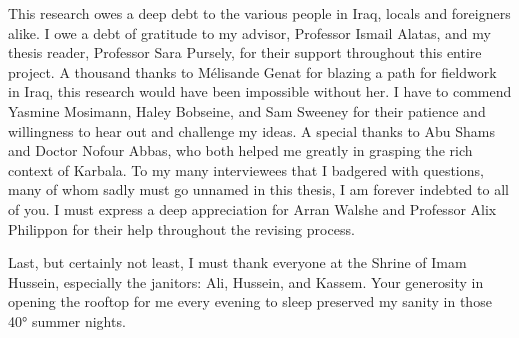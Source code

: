 This research owes a deep debt to the various people in Iraq, locals and foreigners alike. I owe a debt of gratitude to my advisor, Professor Ismail Alatas, and my thesis reader, Professor Sara Pursely, for their support throughout this entire project.
A thousand thanks to Mélisande Genat for blazing a path for fieldwork in Iraq, this research would have been impossible without her. I have to commend Yasmine Mosimann, Haley Bobseine, and Sam Sweeney for their patience and willingness to hear out and challenge my ideas. A special thanks to Abu Shams and Doctor Nofour Abbas, who both helped me greatly in grasping the rich context of Karbala. To my many interviewees that I badgered with questions, many of whom sadly must go unnamed in this thesis, I am forever indebted to all of you. I must express a deep appreciation for Arran Walshe and Professor Alix Philippon for their help throughout the revising process.

Last, but certainly not least, I must thank everyone at the Shrine of Imam Hussein, especially the janitors: Ali, Hussein, and Kassem. Your generosity in opening the rooftop for me every evening to sleep preserved my sanity in those 40° summer nights. 